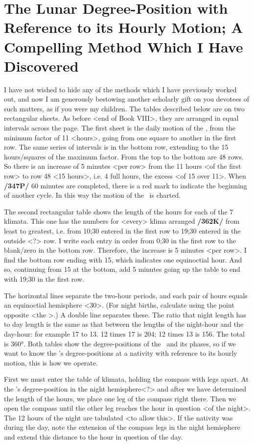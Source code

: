 \section{The Lunar Degree-Position with Reference to its Hourly Motion; A Compelling Method Which I Have Discovered}

I have not wished to hide any of the methods which I have previously worked out, and now I am generously bestowing another scholarly gift on you devotees of such matters, as if you were my children. The tables described below are on two rectangular sheets. As before <end of Book VIII>, they are arranged in equal intervals across the page. The first sheet is the daily motion of the \Moon, from the minimum
factor of 11 <hours>, going from one square to another in the first row. The same series of intervals is in the bottom row, extending to the 15 hours/squares of the maximum factor. From the top to the bottom are 48 rows. So there is an increase of 5 minutes <per row> from the 11 hours <of the first row> to row 48 <15 hours>, i.e. 4 full hours, the excess <of 15 over 11>. When \textbf{/347P/} 60 minutes are completed, there is a red mark to indicate the beginning of another cycle. In this way the motion of the \Moon\, is charted.

The second rectangular table shows the length of the hours for each of the 7 klimata. This one has the numbers for <every> klima arranged \textbf{/362K/} from least to greatest, i.e. from 10;30 entered in the first row to 19;30 entered in the outside <?> row. I write each entry in order from 0;30 in the first row to the blank/zero in the bottom row. Therefore, the increase is 5 minutes <per row>. I find the bottom row ending with 15, which indicates one equinoctial hour. And so, continuing from 15 at the bottom, add 5 minutes going up the table to end with 19;30 in the first row.

The horizontal lines separate the two-hour periods, and each pair of hours equals an equinoctial hemisphere <30>. (For night births, calculate using the point opposite <the \Moon>.) A double line
separates these. The ratio that night length has to day length is the same as that between the lengths of the night-hour and the day-hour: for example 17 to 13. 12 times 17 is 204; 12 times 13 is 156. The total is 360°. Both tables show the degree-positions of the \Moon\, and its phases, so if we want to know the \Moon’s degree-positions at a nativity with reference to its hourly motion, this is how we operate. 

First we must enter the table of klimata, holding the compass with legs apart. At the \Sun’s degree-position in the night hemisphere<?> and after we have determined the length of the hours, we place one leg of the compass right there. Then we open the compass until the other leg reaches the hour in question <of the night>. The 12 hours of the night are tabulated <to allow this>. If the nativity was during the day, note the extension of the compass legs in the night hemisphere and extend this distance to the hour in question of the day.

